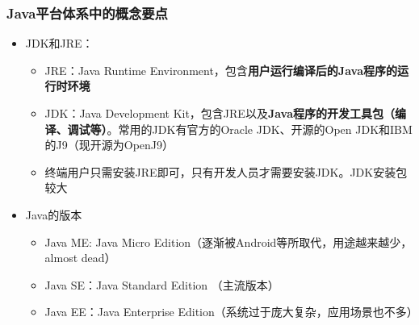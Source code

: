 \begin{frame}
  \frametitle{Java平台体系中的概念要点}
  \begin{itemize}
    \item JDK和JRE：
      \begin{itemize}
        \item JRE：Java Runtime Environment，包含\textbf{用户运行编译后的Java程序的运行时环境}
        \item JDK：Java Development Kit，包含JRE以及\textbf{Java程序的开发工具包（编译、调试等）}。常用的JDK有官方的Oracle JDK、开源的Open JDK和IBM的J9（现开源为OpenJ9）
        \item 终端用户只需安装JRE即可，只有开发人员才需要安装JDK。JDK安装包较大
      \end{itemize}
    \item Java的版本
      \begin{itemize}
        \item Java ME: Java Micro Edition（逐渐被Android等所取代，用途越来越少，almost dead）
        \item Java SE：Java Standard Edition （主流版本）
        \item Java EE：Java Enterprise Edition（系统过于庞大复杂，应用场景也不多）
      \end{itemize}
  \end{itemize}
\end{frame}

